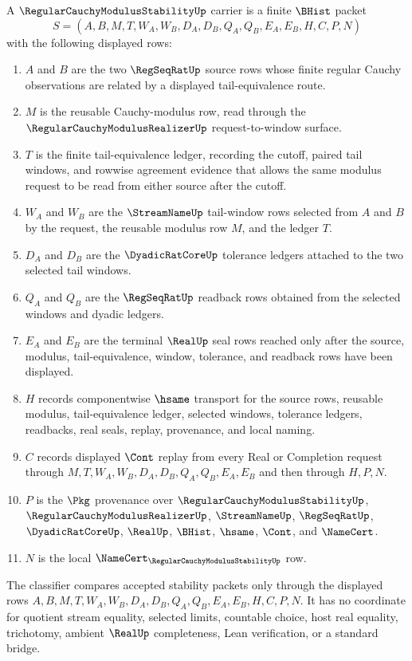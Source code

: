 \begin{definition}
\label{def:regular-cauchy-modulus-stability-carrier}
A $\RegularCauchyModulusStabilityUp$ carrier is a finite $\BHist$ packet
$$
S=(A,B,M,T,W_A,W_B,D_A,D_B,Q_A,Q_B,E_A,E_B,H,C,P,N)
$$
with the following displayed rows:
\begin{enumerate}
\item $A$ and $B$ are the two $\RegSeqRatUp$ source rows whose finite regular Cauchy observations are related by a displayed tail-equivalence route.
\item $M$ is the reusable Cauchy-modulus row, read through the $\RegularCauchyModulusRealizerUp$ request-to-window surface.
\item $T$ is the finite tail-equivalence ledger, recording the cutoff, paired tail windows, and rowwise agreement evidence that allows the same modulus request to be read from either source after the cutoff.
\item $W_A$ and $W_B$ are the $\StreamNameUp$ tail-window rows selected from $A$ and $B$ by the request, the reusable modulus row $M$, and the ledger $T$.
\item $D_A$ and $D_B$ are the $\DyadicRatCoreUp$ tolerance ledgers attached to the two selected tail windows.
\item $Q_A$ and $Q_B$ are the $\RegSeqRatUp$ readback rows obtained from the selected windows and dyadic ledgers.
\item $E_A$ and $E_B$ are the terminal $\RealUp$ seal rows reached only after the source, modulus, tail-equivalence, window, tolerance, and readback rows have been displayed.
\item $H$ records componentwise $\hsame$ transport for the source rows, reusable modulus, tail-equivalence ledger, selected windows, tolerance ledgers, readbacks, real seals, replay, provenance, and local naming.
\item $C$ records displayed $\Cont$ replay from every Real or Completion request through $M,T,W_A,W_B,D_A,D_B,Q_A,Q_B,E_A,E_B$ and then through $H,P,N$.
\item $P$ is the $\Pkg$ provenance over $\RegularCauchyModulusStabilityUp$, $\RegularCauchyModulusRealizerUp$, $\StreamNameUp$, $\RegSeqRatUp$, $\DyadicRatCoreUp$, $\RealUp$, $\BHist$, $\hsame$, $\Cont$, and $\NameCert$.
\item $N$ is the local $\NameCert_{\RegularCauchyModulusStabilityUp}$ row.
\end{enumerate}
The classifier compares accepted stability packets only through the displayed rows $A,B,M,T,W_A,W_B,D_A,D_B,Q_A,Q_B,E_A,E_B,H,C,P,N$. It has no coordinate for quotient stream equality, selected limits, countable choice, host real equality, trichotomy, ambient $\RealUp$ completeness, Lean verification, or a standard bridge.
\end{definition}

